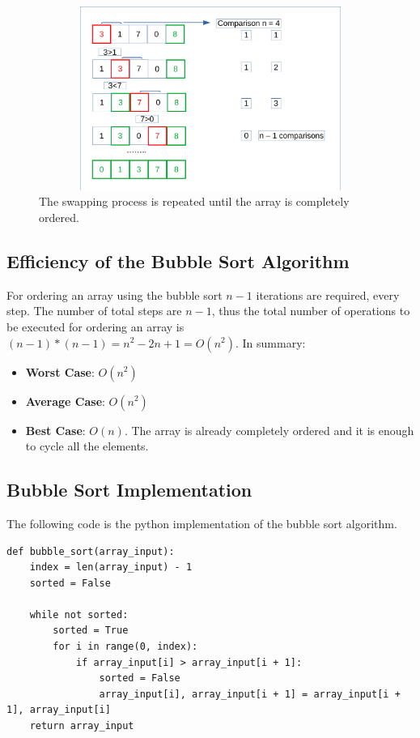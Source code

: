 \begin{figure}[hb]
	\includegraphics[width=14cm,height=6cm]{chapters/searchandsorting/images/sorting_5.pdf}
	\caption[]{The swapping process is repeated until the array is completely ordered.}
	\label{sorting_5}
\end{figure}

\subsection{Efficiency of the Bubble Sort Algorithm}
For ordering an array using the bubble sort \(n - 1\) iterations are required, every step. The number of total steps are \(n - 1\), thus the total number of operations to be executed for ordering an array is \((n - 1)*(n - 1) = n^{2} - 2n + 1 = O(n^{2})\).
In summary:
\begin{itemize}
\item \textbf{Worst Case}: \(O(n^{2})\)
\item \textbf{Average Case}: \(O(n^{2})\)
\item \textbf{Best Case}: \(O(n)\). The array is already completely ordered and it is enough to cycle all the elements.
\end{itemize} 

\subsection{Bubble Sort Implementation}
The following code is the python implementation of the bubble sort algorithm.
\begin{lstlisting}[caption={Bubble Sort python implementation}]
def bubble_sort(array_input):
	index = len(array_input) - 1
	sorted = False
	
	while not sorted:
		sorted = True
		for i in range(0, index):
			if array_input[i] > array_input[i + 1]:
				sorted = False
				array_input[i], array_input[i + 1] = array_input[i + 1], array_input[i]
	return array_input
\end{lstlisting}

